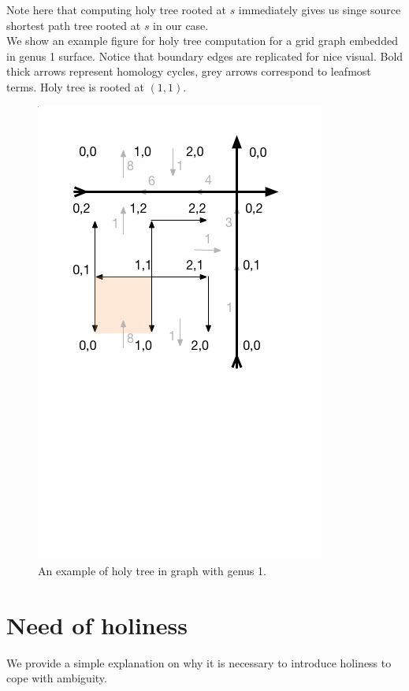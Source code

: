 \documentclass{article}
\begin{document}
Note here that computing holy tree rooted at $s$ immediately gives us singe
source shortest path tree rooted at $s$ in our case. \\

We show an example figure for holy tree computation for a grid graph 
embedded in genus 1 surface. Notice that boundary edges are replicated for nice 
visual. Bold thick arrows represent homology cycles, grey arrows correspond to 
leafmost terms. Holy tree is rooted at $(1, 1)$. 

\begin{figure}
\centering
\includegraphics[scale = 0.5]{figures/g1.jpg}
\vspace{-3.5cm} %
\caption{An example of holy tree in graph with genus 1.}
\end{figure}

\section{Need of holiness}
We provide a simple explanation on why it is necessary to introduce holiness
to cope with ambiguity. \\
\end{document}
